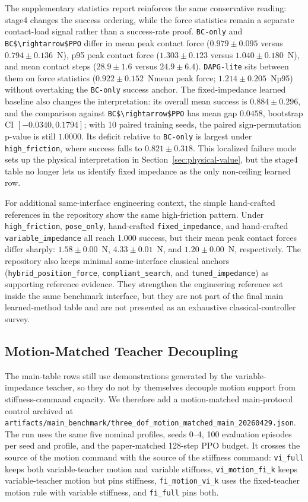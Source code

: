 ﻿\documentclass[11pt]{article}
\newcommand{\code}[1]{\nolinkurl{#1}}
\newcommand{\N}{\ensuremath{\mathrm{N}}}
\begin{document}
The supplementary statistics report reinforces the same conservative reading: stage4 changes the
success ordering, while the force statistics remain a separate contact-load signal rather than a
success-rate proof.
\code{BC-only} and \code{BC$\rightarrow$PPO} differ in mean peak contact force
($0.979 \pm 0.095$ versus $0.794 \pm 0.136$~\N), p95 peak contact force
($1.303 \pm 0.123$ versus $1.040 \pm 0.180$~\N), and mean contact steps
($28.9 \pm 1.6$ versus $24.9 \pm 6.4$). \code{DAPG-lite} sits between them on force statistics
($0.922 \pm 0.152$~\N mean peak force; $1.214 \pm 0.205$~\N p95) without overtaking the
\code{BC-only} success anchor. The fixed-impedance learned baseline also changes the interpretation:
its overall mean success is $0.884 \pm 0.296$, and the comparison against \code{BC$\rightarrow$PPO}
has mean gap $0.0458$, bootstrap CI $[-0.0340, 0.1794]$; with 10 paired training seeds, the paired
sign-permutation p-value is still $1.0000$. Its deficit relative to \code{BC-only} is largest under
\code{high\_friction}, where success falls to $0.821 \pm 0.318$. This localized failure mode sets
up the physical interpretation in Section~\ref{sec:physical-value}, but the stage4 table no longer
lets us identify fixed impedance as the only non-ceiling learned row.

For additional same-interface engineering context, the simple hand-crafted references in the
repository show the same high-friction pattern. Under \code{high\_friction}, \code{pose\_only},
hand-crafted \code{fixed\_impedance}, and hand-crafted \code{variable\_impedance} all reach
1.000 success, but their mean peak contact forces differ sharply:
$1.58 \pm 0.00$~\N, $4.33 \pm 0.01$~\N, and $1.20 \pm 0.00$~\N, respectively. The repository also
keeps minimal same-interface classical anchors (\code{hybrid\_position\_force}, \code{compliant\_search}, and
\code{tuned\_impedance}) as supporting reference evidence. They strengthen the engineering
reference set inside the same benchmark interface, but they are not part of the final main
learned-method table and are not presented as an exhaustive classical-controller survey.

\subsection{Motion-Matched Teacher Decoupling}
\label{sec:motion-matched}

The main-table rows still use demonstrations generated by the variable-impedance teacher, so they do
not by themselves decouple motion support from stiffness-command capacity. We therefore add a
motion-matched main-protocol control archived at
\code{artifacts/main\_benchmark/three\_dof\_motion\_matched\_main\_20260429.json}. The run uses the
same five nominal profiles, seeds 0--4, 100 evaluation episodes per seed and profile, and the
paper-matched 128-step PPO budget. It crosses the source of the motion command with the source of
the stiffness command: \code{vi\_full} keeps both variable-teacher motion and variable stiffness,
\code{vi\_motion\_fi\_k} keeps variable-teacher motion but pins stiffness, \code{fi\_motion\_vi\_k}
uses the fixed-teacher motion rule with variable stiffness, and \code{fi\_full} pins both.
\end{document}

